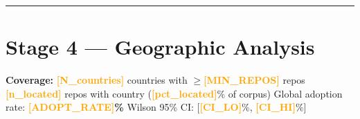 \documentclass[10pt,a4paper]{article}
\newcommand{\FILLIN}[1]{\textcolor{orange}{\textbf{[#1]}}}
\begin{document}

\vspace{6pt}
\hrule
\vspace{6pt}

\newpage
\section*{Stage 4 --- Geographic Analysis}

\textbf{Coverage:} \FILLIN{N\_countries} countries with $\geq$\FILLIN{MIN\_REPOS} repos \quad
\FILLIN{n\_located} repos with country (\FILLIN{pct\_located}\% of corpus) \quad
Global adoption rate: \textbf{\FILLIN{ADOPT\_RATE}\%} \quad
Wilson 95\% CI: [\FILLIN{CI\_LO}\%, \FILLIN{CI\_HI}\%]
\end{document}
